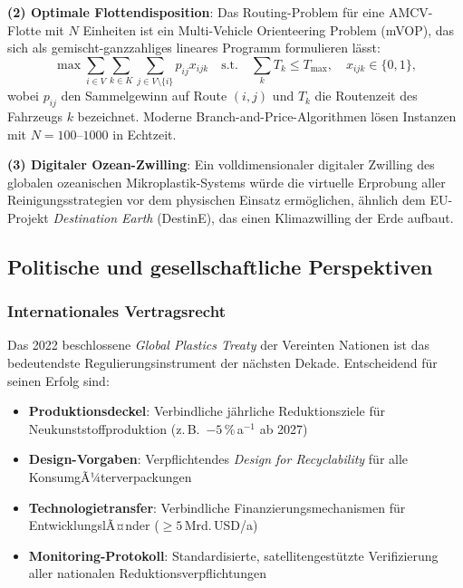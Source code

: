 ﻿\documentclass[12pt,a4paper]{article}
\theoremstyle{definition}
\theoremstyle{remark}
\newcommand{\MP}{Mikroplastik}
\begin{document}
\textbf{(2) Optimale Flottendisposition}: Das Routing-Problem f\"ur
eine AMCV-Flotte mit $N$ Einheiten ist ein Multi-Vehicle Orienteering
Problem (mVOP), das sich als gemischt-ganzzahliges lineares Programm formulieren l\"asst:
\begin{equation}
  \max \sum_{i \in V} \sum_{k \in K} \sum_{j \in V \setminus \{i\}} p_{ij} x_{ijk}
  \quad \text{s.t.} \quad \sum_{k} T_k \leq T_{\max}, \quad x_{ijk} \in \{0,1\},
\end{equation}
wobei $p_{ij}$ den Sammelgewinn auf Route $(i,j)$ und $T_k$ die Routenzeit des
Fahrzeugs $k$ bezeichnet. Moderne Branch-and-Price-Algorithmen l\"osen Instanzen
mit $N = 100$--$1000$ in Echtzeit.

\textbf{(3) Digitaler Ozean-Zwilling}: Ein volldimensionaler digitaler Zwilling
des globalen ozeanischen \MP{}-Systems w\"urde die virtuelle Erprobung aller
Reinigungsstrategien vor dem physischen Einsatz erm\"oglichen, \"ahnlich dem
EU-Projekt \textit{Destination Earth} (DestinE), das einen
Klimazwilling der Erde aufbaut.

\subsection{Politische und gesellschaftliche Perspektiven}

\subsubsection{Internationales Vertragsrecht}

Das 2022 beschlossene \textit{Global Plastics Treaty} der Vereinten Nationen
ist das bedeutendste Regulierungsinstrument der n\"achsten Dekade.
Entscheidend f\"ur seinen Erfolg sind:
\begin{itemize}
  \item \textbf{Produktionsdeckel}: Verbindliche j\"ahrliche Reduktionsziele
        f\"ur Neukunststoffproduktion (z.\,B.\ $-5\,\%$\,a$^{-1}$ ab 2027)
  \item \textbf{Design-Vorgaben}: Verpflichtendes \textit{Design for Recyclability}
        f\"ur alle KonsumgÃ¼terverpackungen
  \item \textbf{Technologietransfer}: Verbindliche Finanzierungsmechanismen
        f\"ur EntwicklungslÃ¤nder ($\geq 5$\,Mrd.\,USD/a)
  \item \textbf{Monitoring-Protokoll}: Standardisierte, satellitengest\"utzte
        Verifizierung aller nationalen Reduktionsverpflichtungen
\end{itemize}
\end{document}
